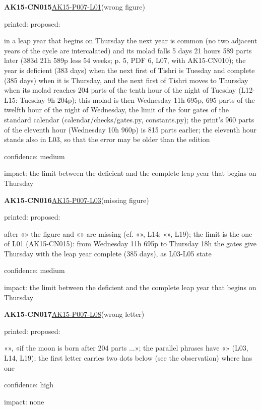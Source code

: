 \documentclass[11pt]{article}
\begin{document}
\noindent\textbf{AK15-CN015}\enspace\hyperlink{AK15-P007-L01}{AK15-P007-L01}\enspace(wrong figure)\par\noindent printed: \enspace proposed: \par\noindent in a leap year that begins on Thursday the next year is common (no two adjacent years of the cycle are intercalated) and its molad falls 5 days 21 hours 589 parts later (383d 21h 589p less 54 weeks; p. 5, PDF 6, L07, with AK15-CN010); the year is deficient (383 days) when the next first of Tishri is Tuesday and complete (385 days) when it is Thursday, and the next first of Tishri moves to Thursday when its molad reaches 204 parts of the tenth hour of the night of Tuesday (L12-L15: Tuesday 9h 204p); this molad is then Wednesday 11h 695p, 695 parts of the twelfth hour of the night of Wednesday, the limit of the four gates of the standard calendar (calendar/checks/gates.py, constants.py); the print's 960 parts of the eleventh hour (Wednesday 10h 960p) is 815 parts earlier; the eleventh hour stands also in L03, so that the error may be older than the edition\par\noindent confidence: medium\par\noindent impact: the limit between the deficient and the complete leap year that begins on Thursday\par\medskip
\noindent\textbf{AK15-CN016}\enspace\hyperlink{AK15-P007-L03}{AK15-P007-L03}\enspace(missing figure)\par\noindent printed: \enspace proposed: \par\noindent after «» the figure and «» are missing (cf. «», L14; «», L19); the limit is the one of L01 (AK15-CN015): from Wednesday 11h 695p to Thursday 18h the gates give Thursday with the leap year complete (385 days), as L03-L05 state\par\noindent confidence: medium\par\noindent impact: the limit between the deficient and the complete leap year that begins on Thursday\par\medskip
\noindent\textbf{AK15-CN017}\enspace\hyperlink{AK15-P007-L08}{AK15-P007-L08}\enspace(wrong letter)\par\noindent printed: \enspace proposed: \par\noindent «», «if the moon is born after 204 parts ...»; the parallel phrases have «» (L03, L14, L19); the first letter carries two dots below (see the observation) where  has one\par\noindent confidence: high\par\noindent impact: none\par\medskip
\end{document}
